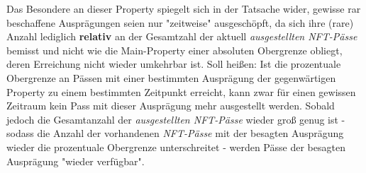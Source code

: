 \vspace{0.3cm}

Das Besondere an dieser Property spiegelt sich in der Tatsache wider, gewisse rar beschaffene Ausprägungen seien nur "zeitweise" ausgeschöpft, da sich ihre (rare) Anzahl lediglich \textbf{relativ} an der Gesamtzahl der aktuell \textit{ausgestellten NFT-Pässe} bemisst und nicht wie die Main-Property einer absoluten Obergrenze obliegt, deren Erreichung nicht wieder umkehrbar ist. Soll heißen: Ist die prozentuale Obergrenze an Pässen mit einer bestimmten Ausprägung der gegenwärtigen Property zu einem bestimmten Zeitpunkt erreicht, kann zwar für einen gewissen Zeitraum kein Pass mit dieser Ausprägung mehr ausgestellt werden. Sobald jedoch die Gesamtanzahl der \textit{ausgestellten NFT-Pässe} wieder groß genug ist - sodass die Anzahl der vorhandenen \textit{NFT-Pässe} mit der besagten Ausprägung wieder die prozentuale Obergrenze unterschreitet - werden Pässe der besagten Ausprägung "wieder verfügbar".

\vspace{0.3cm}

